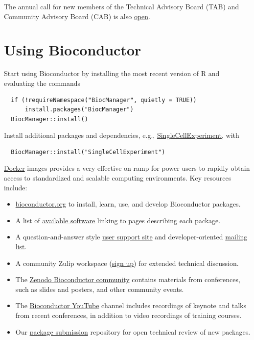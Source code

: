 The annual call for new members of the Technical Advisory Board (TAB) and Community Advisory Board (CAB) is also \href{https://genomic.social/@bioconductor/116894837472783257}{open}.

\section{Using Bioconductor}\label{using-bioconductor}

Start using
Bioconductor by installing the most recent version of R and evaluating
the commands

\begin{verbatim}
  if (!requireNamespace("BiocManager", quietly = TRUE))
      install.packages("BiocManager")
  BiocManager::install()
\end{verbatim}

Install additional packages and dependencies,
e.g., \href{https://bioconductor.org/packages/SingleCellExperiment}{SingleCellExperiment}, with

\begin{verbatim}
  BiocManager::install("SingleCellExperiment")
\end{verbatim}

\href{https://bioconductor.org/help/docker/}{Docker}
images provides a very effective on-ramp for power users to rapidly
obtain access to standardized and scalable computing environments.
Key resources include:

\begin{itemize}
\tightlist
\item
  \href{https://bioconductor.org}{bioconductor.org} to install,
  learn, use, and develop Bioconductor packages.
\item
  A list of \href{https://bioconductor.org/packages}{available software}
  linking to pages describing each package.
\item
  A question-and-answer style
  \href{https://support.bioconductor.org}{user support site} and
  developer-oriented \href{https://stat.ethz.ch/mailman/listinfo/bioc-devel}{mailing list}.
\item
  A community Zulip workspace (\href{https://chat.bioconductor.org}{sign up})
  for extended technical discussion.
\item
  The \href{https://zenodo.org/communities/bioconductor}{Zenodo Bioconductor community} contains materials from conferences, such as slides and posters, and other community events.
\item
  The \href{https://www.youtube.com/user/bioconductor}{Bioconductor YouTube}
  channel includes recordings of keynote and talks from recent
  conferences, in addition to
  video recordings of training courses.
\item
  Our \href{https://github.com/Bioconductor/BiocContributions}{package submission}
  repository for open technical review of new packages.
\end{itemize}

